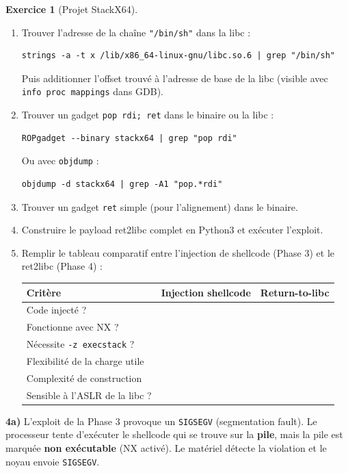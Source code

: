 \documentclass[a4paper,11pt]{article}
\theoremstyle{plain}
\theoremstyle{definition}
\newtheorem{exercice}{Exercice}
\begin{document}
\begin{exercice}[Projet StackX64]
\begin{enumerate}
\item[\textbf{4c)}] Trouver l'adresse de la chaîne \texttt{"/bin/sh"} dans la libc :
\begin{lstlisting}[style=GDBStyle]
strings -a -t x /lib/x86_64-linux-gnu/libc.so.6 | grep "/bin/sh"
\end{lstlisting}
Puis additionner l'offset trouvé à l'adresse de base de la libc (visible avec \texttt{info proc mappings} dans GDB).

\item[\textbf{4d)}] Trouver un gadget \texttt{pop rdi; ret} dans le binaire ou la libc :
\begin{lstlisting}[style=GDBStyle]
ROPgadget --binary stackx64 | grep "pop rdi"
\end{lstlisting}
Ou avec \texttt{objdump} :
\begin{lstlisting}[style=GDBStyle]
objdump -d stackx64 | grep -A1 "pop.*rdi"
\end{lstlisting}

\item[\textbf{4e)}] Trouver un gadget \texttt{ret} simple (pour l'alignement) dans le binaire.

\item[\textbf{4f)}] Construire le payload ret2libc complet en Python3 et exécuter l'exploit.

\item[\textbf{4g)}] Remplir le tableau comparatif entre l'injection de shellcode (Phase 3) et le ret2libc (Phase 4) :
\begin{center}
\begin{tabular}{lcc}
\toprule
\textbf{Critère} & \textbf{Injection shellcode} & \textbf{Return-to-libc} \\
\midrule
Code injecté ? & & \\
Fonctionne avec NX ? & & \\
Nécessite \texttt{-z execstack} ? & & \\
Flexibilité de la charge utile & & \\
Complexité de construction & & \\
Sensible à l'ASLR de la libc ? & & \\
\bottomrule
\end{tabular}
\end{center}
\end{enumerate}

\begin{correction}

\textbf{4a)} L'exploit de la Phase 3 provoque un \texttt{SIGSEGV} (segmentation fault). Le processeur tente d'exécuter le shellcode qui se trouve sur la \textbf{pile}, mais la pile est marquée \textbf{non exécutable} (NX activé). Le matériel détecte la violation et le noyau envoie \texttt{SIGSEGV}.


\end{correction}
\end{exercice}
\end{document}
